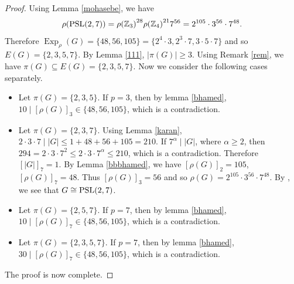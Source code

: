 \documentclass[12pt]{amsart}
\theoremstyle{definition}
\begin{document}
	\begin{proof}
			Using Lemma \ref{mohasebe}, we have
		\begin{align*}
			\rho({\rm PSL}(2,7))={\rho(\mathbb{Z}_{3})}^{28} {\rho(\mathbb{Z}_{4})}^{21}  7^{56}=2^{105}\cdot3^{56}\cdot7^{48}.
		\end{align*}
		Therefore $ {\operatorname{Exp}}_{\rho}(G) = \{48, 56, 105\}=\{2^4\cdot3,   2^3\cdot7, 3\cdot5\cdot7  \}$
		and so $E(G)=\{2, 3, 5, 7\}$.
		By Lemma  \ref{111}, $|\pi(G)|\geqslant 3$.
Using Remark \ref{rem}, we have $\pi(G) \subseteq  E(G)=\{2, 3, 5, 7\}$. 
		Now we consider the following cases separately.
		\begin{itemize}
			\item Let $ \pi(G) = \{2, 3, 5\} $. If $p=3$, then by lemma \ref{bhamed}, $ 10 \mid [\rho(G)]_3 \in \{48, 56,105\}$, which is a contradiction.
			\item Let $ \pi(G) = \{2, 3, 7\} $. 
			Using Lemma \ref{karan},
			$	2 \cdot 3 \cdot 7  \mid |G| \leq 1 + 48 + 56 + 105=210.	$
			If $7^{\alpha}\mid |G|$, where $\alpha\geq2$, then $294=2 \cdot 3 \cdot 7^2 \leq 2 \cdot 3 \cdot 7^\alpha \leq210$, which is a contradiction.
			Therefore $[|G|]_7=1$. By Lemma \ref{bbbhamed},
			we have $[\rho(G)]_2=105$, $[\rho(G)]_7=48$. Thus  $[\rho(G)]_3=56$  and so
			$\rho(G) = 2^{105}\cdot3^{56}\cdot 7^{48}$.
			By  \cite[Theorem 4]{baniMal}, we see that $G \cong {\rm PSL}(2, 7)$.
			\item Let $ \pi(G) = \{2, 5, 7\} $. 
			If $p=7$, then by lemma \ref{bhamed}, $ 10 \mid [\rho(G)]_7 \in \{48, 56,105\}$, which is a contradiction.
			\item Let $ \pi(G) = \{2, 3, 5, 7\} $.
			If $p=7$, then by lemma \ref{bhamed}, $ 30 \mid [\rho(G)]_7 \in \{48, 56,105\}$, which is a contradiction.
		\end{itemize}
	The proof is now complete.
	\end{proof}
\end{document}
